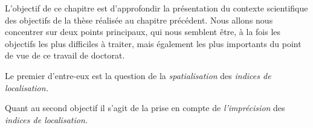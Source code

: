 L'objectif de ce chapitre est d'approfondir la présentation du
contexte scientifique des objectifs de la thèse réalisée au chapitre
précédent. Nous allons nous concentrer sur deux points principaux, qui
nous semblent être, à la fois les objectifs les plus difficiles à
traiter, mais également les plus importants du point de vue de ce
travail de doctorat.

Le premier d'entre-eux est la question de la \emph{spatialisation} des
\emph{indices de localisation.}

Quant au second objectif il s'agit de la prise en compte de
\emph{l'imprécision} des \emph{indices de localisation.}

